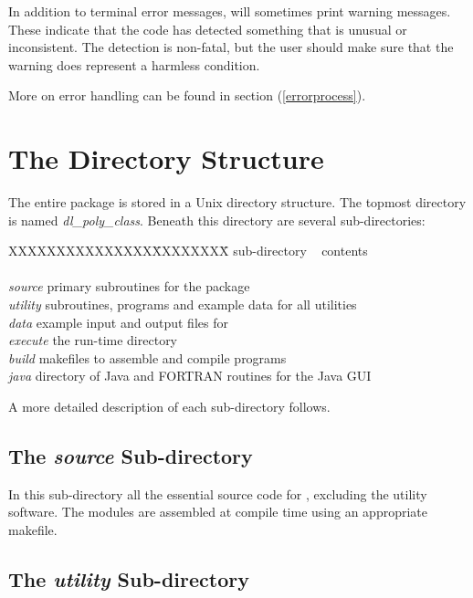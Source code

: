 In addition to terminal error messages, \D{} will sometimes
print warning messages. These indicate that the code has detected
something that is unusual or inconsistent. The detection is non-fatal,
but the user should make sure that the warning does represent a
harmless condition.

More on error handling can be found in section (\ref{errorprocess}).

\section{The \D{} Directory Structure}
\label{directory}

The entire \D{} package is stored in a Unix directory structure.  The
topmost directory is named {\em dl\_poly\_class}.
Beneath this directory are several sub-directories:
\begin{tabbing}
XXXXXXXXXXXXXXX\=XXXXXXXX\= \kill
sub-directory\> ~ \> contents \\
\> \> \\
{\em source} \> primary subroutines for the \D{} package\\
{\em utility} \> subroutines, programs and example data for all utilities \\
{\em data} \> example input and output files for \D{} \\
{\em execute} \> the \D{} run-time directory \\
{\em build} \> makefiles to assemble and compile \D{} programs \\
{\em java} \> directory of Java and FORTRAN routines for the Java GUI \\
\end{tabbing}

A more detailed description of each sub-directory follows.

\subsection{The {\em source} Sub-directory}

In this sub-directory all the essential source code for \D{}, excluding the
utility software. The modules are assembled at compile time using an
appropriate makefile.

\subsection{The {\em utility} Sub-directory}

